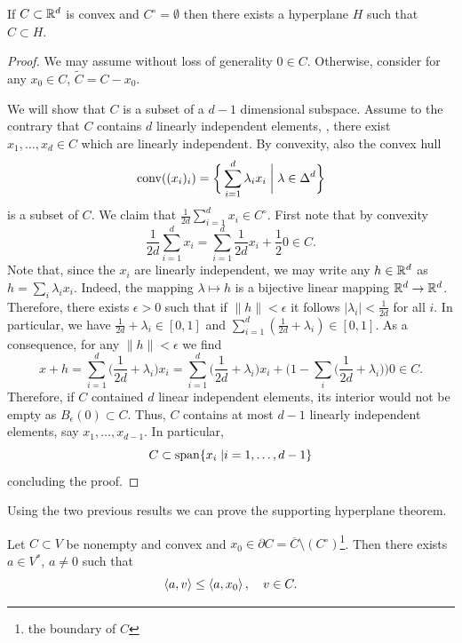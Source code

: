 \begin{lemma}
    If $C\subset\mathbb{R}^d$ is convex and $C^\circ=\emptyset$ then there exists a hyperplane $H$ such that $C\subset H$.
\end{lemma}
\begin{proof}
    We may assume without loss of generality $0\in C$. Otherwise, consider for any $x_0\in C$, $\tilde{C} = C-x_0$. 
    
    We will show that $C$ is a subset of a $d-1$ dimensional subspace. Assume to the contrary that $C$ contains $d$ linearly independent elements, \ie, there exist $x_1,\dots,x_d\in C$ which are linearly independent. By convexity, also the convex hull
    \begin{equation}
        \operatorname{\mathrm{conv}}((x_i)_i)=\bigg\{ \sum_{i=1}^d\lambda_i x_i\;\bigg|\; \lambda\in \Delta^d\bigg\}
    \end{equation}
    is a subset of $C$. We claim that $\frac{1}{2d}\sum_{i=1}^d x_i\in C^\circ$. First note that by convexity
    \[
        \frac{1}{2d}\sum_{i=1}^d x_i = \sum_{i=1}^d \frac{1}{2d} x_i + \frac{1}{2}0 \in C.
    \]
    Note that, since the $x_i$ are linearly independent, we may write any $h\in\mathbb{R}^d$ as $h=\sum_i \lambda_i x_i$. Indeed, the mapping $\lambda\mapsto h$ is a bijective linear mapping $\mathbb{R}^d\rightarrow\mathbb{R}^d$. Therefore, there exists $\epsilon>0$ such that if $\|h\|<\epsilon$ it follows $|\lambda_i|<\frac{1}{2d}$ for all $i$. In particular, we have $\frac{1}{2d} + \lambda_i \in [0,1]$ and $\sum_{i=1}^d (\frac{1}{2d} + \lambda_i)\in [0,1]$.
    As a consequence, for any $\|h\|<\epsilon$ we find
    \begin{equation}
        x+h = \sum_{i=1}^d \big(\frac{1}{2d} + \lambda_i\big) x_i = \sum_{i=1}^d \big(\frac{1}{2d} + \lambda_i\big) x_i + \bigg(1 - \sum_i\big(\frac{1}{2d} + \lambda_i\big) \bigg)0\in C.
    \end{equation}
    Therefore, if $C$ contained $d$ linear independent elements, its interior would not be empty as $B_\epsilon(0)\subset C$. Thus, $C$ contains at most $d-1$ linearly independent elements, say $x_1,\dots,x_{d-1}$. In particular, 
    \[
        C\subset \operatorname{\mathrm{span}} \{ x_i\;|i=1,\dots,d-1\}
    \]
    concluding the proof.
\end{proof}
Using the two previous results we can prove the supporting hyperplane theorem.
\begin{theorem}
    Let $C\subset V$ be nonempty and convex and $x_0\in \partial C = \overline{C}\setminus(C^\circ)$\footnote{the boundary of $C$}. Then there exists $a\in V^*$, $a\neq 0$ such that
    \begin{equation}\label{subgradient:eq:supporting}
        \left\langle a , v\right\rangle\leq \left\langle a , x_0\right\rangle,\quad v\in C.
    \end{equation}
\end{theorem}
